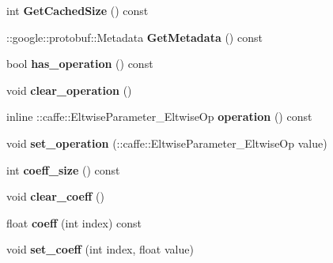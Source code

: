 \begin{DoxyCompactItemize}
int {\bfseries Get\+Cached\+Size} () const
\item 
\mbox{\label{classcaffe_1_1_eltwise_parameter_a4f7c25086369077e315dbeb19e7838a5}} 
\+::google\+::protobuf\+::\+Metadata {\bfseries Get\+Metadata} () const
\item 
\mbox{\label{classcaffe_1_1_eltwise_parameter_abc6d193903c5dc36ee711135a8277983}} 
bool {\bfseries has\+\_\+operation} () const
\item 
\mbox{\label{classcaffe_1_1_eltwise_parameter_a02095e77f6a2e6afb711e7999444c8cd}} 
void {\bfseries clear\+\_\+operation} ()
\item 
\mbox{\label{classcaffe_1_1_eltwise_parameter_a8704f5d322548e6c2c4223706ed942db}} 
inline \+::caffe\+::\+Eltwise\+Parameter\+\_\+\+Eltwise\+Op {\bfseries operation} () const
\item 
\mbox{\label{classcaffe_1_1_eltwise_parameter_a608a2e0f965649f327426cb2a46923d9}} 
void {\bfseries set\+\_\+operation} (\+::caffe\+::\+Eltwise\+Parameter\+\_\+\+Eltwise\+Op value)
\item 
\mbox{\label{classcaffe_1_1_eltwise_parameter_a6864981a3d5f528cb13ae00b25bae3a9}} 
int {\bfseries coeff\+\_\+size} () const
\item 
\mbox{\label{classcaffe_1_1_eltwise_parameter_a43790b180f32abe526e71744d5aea96f}} 
void {\bfseries clear\+\_\+coeff} ()
\item 
\mbox{\label{classcaffe_1_1_eltwise_parameter_aa8e653930b71babc4da53b1b928a9965}} 
float {\bfseries coeff} (int index) const
\item 
\mbox{\label{classcaffe_1_1_eltwise_parameter_ae3138a9c622f4fcf3b2bae10cd82fec2}} 
void {\bfseries set\+\_\+coeff} (int index, float value)
\item 
\mbox{\label{classcaffe_1_1_eltwise_parameter_a2a9af9bb71f3037936217ed5c360ebc3}} 

\end{DoxyCompactItemize}
